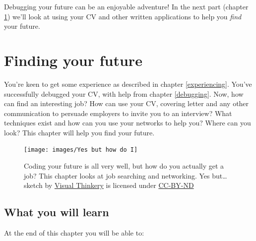 \documentclass[
]{book}
\begin{document}
Debugging your future can be an enjoyable adventure! In the next part (chapter \ref{finding}) we'll look at using your CV and other written applications to help you \emph{find} your future.

\hypertarget{finding}{%
\chapter{Finding your future}\label{finding}}

You're keen to get some experience as described in chapter \ref{experiencing}. You've successfully debugged your CV, with help from chapter \ref{debugging}. Now, how can find an interesting job? How can use your CV, covering letter and any other communication to persuade employers to invite you to an interview? What techniques exist and how can you use your networks to help you? Where can you look? This chapter will help you find your future. 🔭

\begin{figure}

{\centering \texttt{[image: images/Yes but how do I]} 

}

\caption{Coding your future is all very well, but how do you actually get a job? This chapter looks at job searching and networking. Yes but\ldots{} sketch by \href{https://visualthinkery.com}{Visual Thinkery} is licensed under \href{https://creativecommons.org/licenses/by-nd/4.0/}{CC-BY-ND}}\label{fig:yesbut-fig}
\end{figure}



\hypertarget{ilo8}{%
\section{What you will learn}\label{ilo8}}

At the end of this chapter you will be able to:
\end{document}

